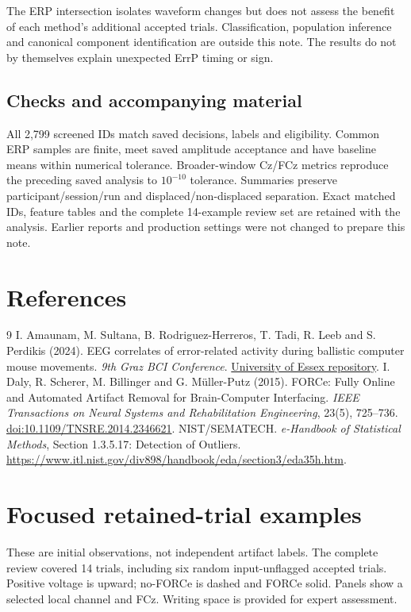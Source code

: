 \documentclass[11pt,a4paper]{article}
\begin{document}
The ERP intersection isolates waveform changes but does not assess the benefit of each method's additional accepted trials. Classification, population inference and canonical component identification are outside this note. The results do not by themselves explain unexpected ErrP timing or sign.
\subsection{Checks and accompanying material}
All 2,799 screened IDs match saved decisions, labels and eligibility. Common ERP samples are finite, meet saved amplitude acceptance and have baseline means within numerical tolerance. Broader-window Cz/FCz metrics reproduce the preceding saved analysis to $10^{-10}$ tolerance. Summaries preserve participant/session/run and displaced/non-displaced separation. Exact matched IDs, feature tables and the complete 14-example review set are retained with the analysis. Earlier reports and production settings were not changed to prepare this note.
\clearpage\appendix
\section{References}
\begin{thebibliography}{9}
 I. Amaunam, M. Sultana, B. Rodriguez-Herreros, T. Tadi, R. Leeb and S. Perdikis (2024). EEG correlates of error-related activity during ballistic computer mouse movements. \textit{9th Graz BCI Conference}. \href{https://repository.essex.ac.uk/38379/1/tDCS_ErrP_9th_Graz_BCI_Conference_2024.pdf}{University of Essex repository}.
 I. Daly, R. Scherer, M. Billinger and G. M\"uller-Putz (2015). FORCe: Fully Online and Automated Artifact Removal for Brain-Computer Interfacing. \textit{IEEE Transactions on Neural Systems and Rehabilitation Engineering}, 23(5), 725--736. \href{https://doi.org/10.1109/TNSRE.2014.2346621}{doi:10.1109/TNSRE.2014.2346621}.
 NIST/SEMATECH. \textit{e-Handbook of Statistical Methods}, Section 1.3.5.17: Detection of Outliers. \url{https://www.itl.nist.gov/div898/handbook/eda/section3/eda35h.htm}.
\end{thebibliography}
\clearpage
\section{Focused retained-trial examples}\label{app:examples}
These are initial observations, not independent artifact labels. The complete review covered 14 trials, including six random input-unflagged accepted trials. Positive voltage is upward; no-FORCe is dashed and FORCe solid. Panels show a selected local channel and FCz. Writing space is provided for expert assessment.
\end{document}
